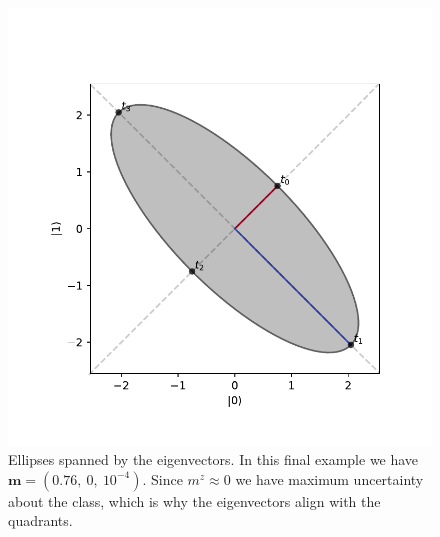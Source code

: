 \clearpage

\begin{figure}[htb!]
    \centering
    \includegraphics[clip,width=1.\linewidth]{figures/chapter3/combined_ellipses_2.pdf}

    \caption{Ellipses spanned by the eigenvectors. In this final example we have $\mathbf{m} = (0.76,\: 0 ,\: 10^{-4})$. Since $m^z\approx0$ we have maximum uncertainty about the class, which is why the eigenvectors align with the quadrants.}
    \label{fig:ellipse_2}
\end{figure}

